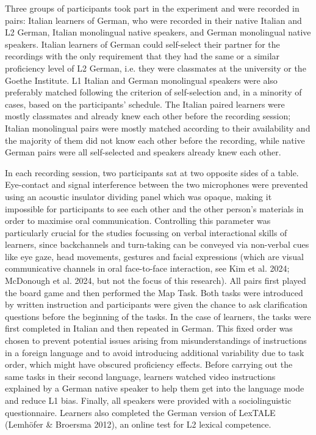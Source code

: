 \begin{styleStandard}
Three groups of participants took part in the experiment and were recorded in pairs: Italian learners of German, who were recorded in their native Italian and L2 German, Italian monolingual native speakers, and German monolingual native speakers. Italian learners of German could self-select their partner for the recordings with the only requirement that they had the same or a similar proficiency level of L2 German, i.e. they were classmates at the university or the Goethe Institute. L1 Italian and German monolingual speakers were also preferably matched following the criterion of self-selection and, in a minority of cases, based on the participants’ schedule. The Italian paired learners were mostly classmates and already knew each other before the recording session; Italian monolingual pairs were mostly matched according to their availability and the majority of them did not know each other before the recording, while native German pairs were all self-selected and speakers already knew each other.
\end{styleStandard}

\begin{styleStandard}
In each recording session, two participants sat at two opposite sides of a table. Eye-contact and signal interference between the two microphones were prevented using an acoustic insulator dividing panel which was opaque, making it impossible for participants to see each other and the other person’s materials in order to maximise oral communication. Controlling this parameter was particularly crucial for the studies focussing on verbal interactional skills of learners, since backchannels and turn-taking can be conveyed via non-verbal cues like eye gaze, head movements, gestures and facial expressions (which are visual communicative channels in oral face-to-face interaction, see Kim et al. 2024; McDonough et al. 2024, but not the focus of this research). All pairs first played the board game and then performed the Map Task. Both tasks were introduced by written instruction and participants were given the chance to ask clarification questions before the beginning of the tasks. In the case of learners, the tasks were first completed in Italian and then repeated in German. This fixed order was chosen to prevent potential issues arising from misunderstandings of instructions in a foreign language and to avoid introducing additional variability due to task order, which might have obscured proficiency effects. Before carrying out the same tasks in their second language, learners watched video instructions explained by a German native speaker to help them get into the language mode and reduce L1 bias. Finally, all speakers were provided with a sociolinguistic questionnaire. Learners also completed the German version of LexTALE (Lemhöfer \& Broersma 2012), an online test for L2 lexical competence.
\end{styleStandard}

